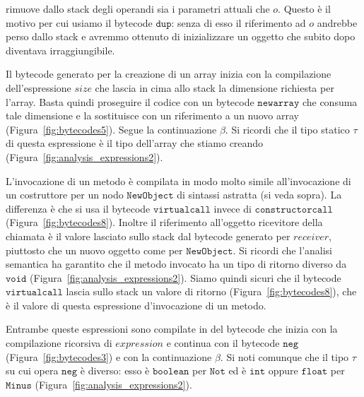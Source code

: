 \begin{description}
  rimuove dallo stack degli operandi sia i parametri attuali che $o$.
  Questo \`e il motivo per cui usiamo il bytecode $\mathtt{dup}$:
  senza di esso il riferimento ad $o$ andrebbe perso dallo stack
  e avremmo ottenuto di inizializzare un oggetto che subito dopo
  diventava irraggiungibile.
\item[\underline{$\mathtt{NewArray(\mathit{elementsType},\mathit{size})}$}.]
  Il bytecode generato per la creazione di un array inizia con
  la compilazione dell'espressione $\mathit{size}$ che lascia in cima allo
  stack la dimensione richiesta per l'array.
  Basta quindi proseguire il codice con un bytecode $\mathtt{newarray}$ che
  consuma tale dimensione e la sostituisce con un riferimento a un nuovo
  array (Figura~\ref{fig:bytecodes5}). Segue la continuazione $\beta$.
  Si ricordi che il tipo statico $\tau$ di questa espressione \`e il tipo
  dell'array che stiamo creando (Figura~\ref{fig:analysis_expressions2}).
\item[\underline{$\mathtt{MethodCallExpression(\mathit{receiver},\mathit{name},
  \mathit{actuals})}$}.]
  L'invocazione di un metodo \`e compilata in modo molto simile all'invocazione
  di un costruttore per un nodo $\mathtt{NewObject}$ di sintassi astratta
  (si veda sopra). La differenza \`e che si usa il bytecode
  $\mathtt{virtualcall}$ invece di $\mathtt{constructorcall}$
  (Figura~\ref{fig:bytecodes8}). Inoltre il riferimento all'oggetto
  ricevitore della chiamata \`e il valore lasciato sullo stack dal
  bytecode generato per $\mathit{receiver}$, piuttosto che un nuovo oggetto
  come per $\mathtt{NewObject}$. Si ricordi che l'analisi semantica ha
  garantito che il metodo invocato ha un tipo di ritorno diverso da
  $\mathtt{void}$ (Figura~\ref{fig:analysis_expressions2}). Siamo quindi
  sicuri che il bytecode $\mathtt{virtualcall}$ lascia sullo stack un
  valore di ritorno (Figura~\ref{fig:bytecodes8}), che \`e il valore di
  questa espressione d'invocazione di un metodo.
\item[\underline{$\mathtt{Not(\mathit{expression})}$} e
  \underline{$\mathtt{Minus(\mathit{expression})}$}.]
  Entrambe queste espressioni sono compilate in del bytecode che
  inizia con la compilazione ricorsiva di $\mathit{expression}$ e continua
  con il bytecode $\mathtt{neg}$ (Figura~\ref{fig:bytecodes3})
  e con la continuazione $\beta$. Si noti comunque che il tipo $\tau$
  su cui opera $\mathtt{neg}$ \`e diverso: esso \`e $\mathtt{boolean}$
  per $\mathtt{Not}$ ed \`e $\mathtt{int}$ oppure $\mathtt{float}$ per
  $\mathtt{Minus}$ (Figura~\ref{fig:analysis_expressions2}).

\end{description}
